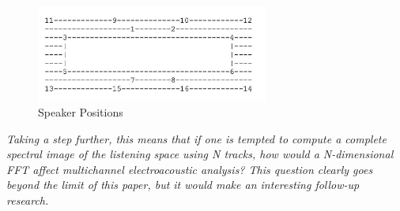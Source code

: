 \documentclass{article}
\begin{document}
\begin{figure}
\begin{center}
\includegraphics[width=3in]{foryoungears-img001.jpg}
\end{center}
\caption{Speaker Positions}
\end{figure}




\begin{center}
\textit{Taking a step further, this means that if one is tempted to compute a complete spectral image of the listening space using N tracks, how would a N-dimensional FFT affect multichannel electroacoustic analysis? This question clearly goes beyond the limit of this paper, but it would make an interesting follow-up research.}

\end{center}

\newpage
\end{document}
